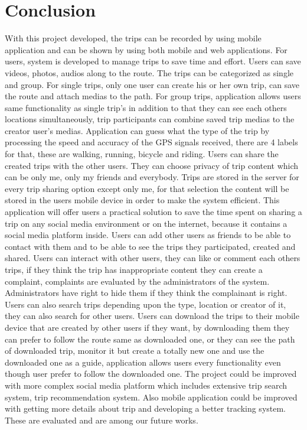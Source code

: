 \chapter{Conclusion}

	With this project developed, the trips can be recorded by using mobile application and can be shown by using both mobile and web applications. For users, system is developed to manage trips to save time and effort. Users can save videos, photos, audios along to the route. The trips can be categorized as single and group. For single trips, only one user can create his or her own trip, can save the route and attach medias to the path. For group trips, application allows users same functionality as single trip's in addition to that they can see each others locations simultaneously, trip participants can combine saved trip medias to the creator user's medias. Application can guess what the type of the trip by processing the speed and accuracy of the GPS signals received, there are 4 labels for that, these are walking, running, bicycle and riding. Users can share the created trips with the other users. They can choose privacy of trip content which can be only me, only my friends and everybody. Trips are stored in the server for every trip sharing option except only me, for that selection the content will be stored in the users mobile device in order to make the system efficient. This application will offer users a practical solution to save the time spent on sharing a trip on any social media environment or on the internet, because it contains a social media platform inside. Users can add other users as friends to be able to contact with them and to be able to see the trips they participated, created and shared. Users can interact with other users, they can like or comment each others trips, if they think the trip has inappropriate content they can create a complaint, complaints are evaluated by the administrators of the system. Administrators have right to hide them if they think the complainant is right. Users can also search trips depending upon the type, location or creator of it, they can also search for other users. Users can download the trips to their mobile device that are created by other users if they want, by downloading them they can prefer to follow the route same as downloaded one, or they can see the path of downloaded trip, monitor it but create a totally new one and use the downloaded one as a guide, application allows users every functionality even though user prefer to follow the downloaded one.
	The project could be improved with more complex social media platform which includes extensive trip search system, trip recommendation system. Also mobile application could be improved with getting more details about trip and developing a better tracking system. These are evaluated and are among our future works.

